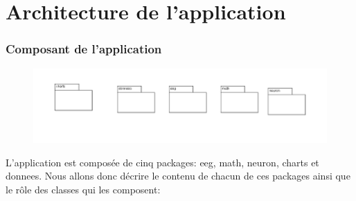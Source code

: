 \part{Architecture de l'application} %
\label{prt:architecture_ _de_ _l_'_application_}
	
	\section{Composant de l'application} %
	\label{sec:composant_de_l_application}
	\begin{figure}[h!]
			\centering
		    \includegraphics []{../diagramme_classes/packages.png} \\
			\label{fig_pack}
	\end{figure}
	L'application est composée de cinq packages: eeg, math, neuron, charts et donnees. Nous allons donc décrire le contenu de chacun de ces packages ainsi que le rôle des classes qui les composent:
